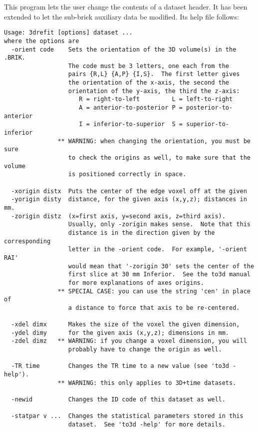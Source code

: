 This program lets the user change the contents of a dataset header.
It has been extended to let the sub-brick auxiliary data be modified.
Its help file follows:
\begin{verbatim}
Usage: 3drefit [options] dataset ...
where the options are
  -orient code    Sets the orientation of the 3D volume(s) in the .BRIK.
                  The code must be 3 letters, one each from the
                  pairs {R,L} {A,P} {I,S}.  The first letter gives
                  the orientation of the x-axis, the second the
                  orientation of the y-axis, the third the z-axis:
                     R = right-to-left         L = left-to-right
                     A = anterior-to-posterior P = posterior-to-anterior
                     I = inferior-to-superior  S = superior-to-inferior
               ** WARNING: when changing the orientation, you must be sure
                  to check the origins as well, to make sure that the volume
                  is positioned correctly in space.

  -xorigin distx  Puts the center of the edge voxel off at the given
  -yorigin disty  distance, for the given axis (x,y,z); distances in mm.
  -zorigin distz  (x=first axis, y=second axis, z=third axis).
                  Usually, only -zorigin makes sense.  Note that this
                  distance is in the direction given by the corresponding
                  letter in the -orient code.  For example, '-orient RAI'
                  would mean that '-zorigin 30' sets the center of the
                  first slice at 30 mm Inferior.  See the to3d manual
                  for more explanations of axes origins.
               ** SPECIAL CASE: you can use the string 'cen' in place of
                  a distance to force that axis to be re-centered.

  -xdel dimx      Makes the size of the voxel the given dimension,
  -ydel dimy      for the given axis (x,y,z); dimensions in mm.
  -zdel dimz   ** WARNING: if you change a voxel dimension, you will
                  probably have to change the origin as well.

  -TR time        Changes the TR time to a new value (see 'to3d -help').
               ** WARNING: this only applies to 3D+time datasets.

  -newid          Changes the ID code of this dataset as well.

  -statpar v ...  Changes the statistical parameters stored in this
                  dataset.  See 'to3d -help' for more details.


\end{verbatim}
